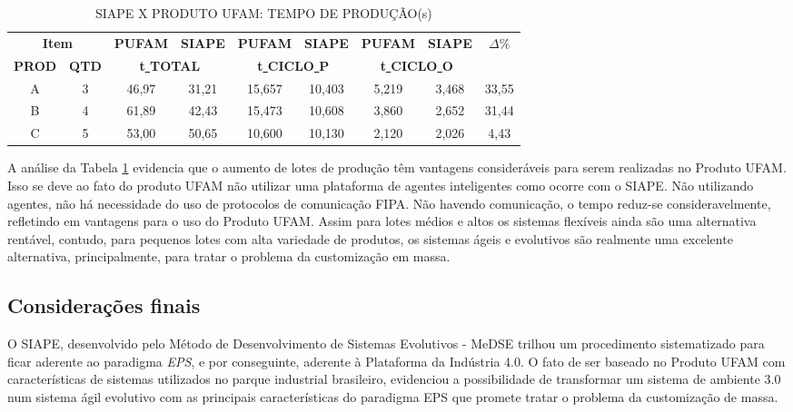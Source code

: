 \documentclass[10pt,letterpaper,twocolumn]{IEEEtran}
\begin{document}
\begin{table}
	\small
	\centering
	\caption{SIAPE X PRODUTO UFAM: TEMPO DE PRODUÇÃO(s)}
	\begin{tabular}{c c | c c | c c | c c | c}
		\multicolumn{2}{c|}{\textbf{Item}} & 
		\textbf{PUFAM} & \textbf{SIAPE} & 
		\textbf{PUFAM} & \textbf{SIAPE} & 
		\textbf{PUFAM} & \textbf{SIAPE} &
		\multirow{2}{*}{$\Delta\%$} \\
		
		\textbf{PROD} & \textbf{QTD} & 
		\multicolumn{2}{c|}{\textbf{t\underline{ }TOTAL}} &
		\multicolumn{2}{c|}{\textbf{t\underline{ }CICLO\underline{ }P}} &
		\multicolumn{2}{c|}{\textbf{t\underline{ }CICLO\underline{ }O}} &
		~ \\ \hline \hline
		
		A &  3  & 46,97 & 31,21  & 15,657 & 10,403 &  5,219  &  3,468 & 33,55 \\
		\hline
		
		B &  4  & 61,89 & 42,43  & 15,473 & 10,608 &  3,860  &  2,652 & 31,44 \\
		\hline
		
		C &  5  & 53,00 & 50,65  & 10,600 & 10,130 &  2,120  &  2,026 &  4,43 \\
		
		
	\end{tabular}
	\label{T19}\par
\end{table}

A análise da Tabela \ref{T19} evidencia que o aumento de lotes  de produção têm vantagens consideráveis para serem realizadas no Produto UFAM. Isso se deve ao fato do produto UFAM não utilizar uma plataforma de agentes inteligentes como ocorre com o SIAPE. Não utilizando agentes, não há necessidade do uso de protocolos de comunicação FIPA. Não havendo comunicação, o tempo reduz-se consideravelmente, refletindo em vantagens para o uso do Produto UFAM. Assim para lotes médios e altos os sistemas flexíveis ainda são uma alternativa rentável, contudo, para pequenos lotes com alta variedade de produtos, os sistemas ágeis e evolutivos são realmente uma excelente alternativa, principalmente, para tratar o problema da customização em massa.


\subsection{Considerações finais}

O SIAPE, desenvolvido pelo Método de Desenvolvimento de Sistemas Evolutivos - MeDSE trilhou um procedimento sistematizado para ficar aderente ao paradigma \textit{EPS}, e por conseguinte, aderente à Plataforma da Indústria 4.0. O fato de ser baseado no Produto UFAM com características de sistemas utilizados no parque industrial brasileiro, evidenciou a possibilidade de transformar um sistema de ambiente 3.0 num sistema ágil evolutivo com as principais características do paradigma EPS que promete tratar o problema da customização de massa.
\end{document}
